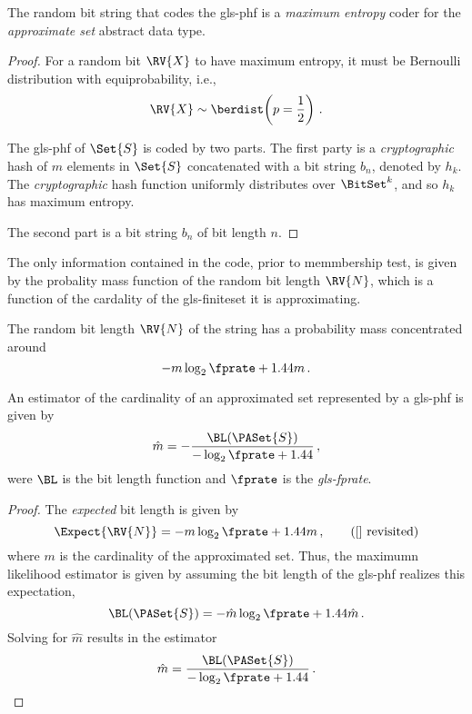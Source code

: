 \begin{theorem}
The random bit string that codes the \gls{gls-phf} is a \emph{maximum entropy} coder for the \emph{approximate set} abstract data type.
\end{theorem}
\begin{proof}
For a random bit $\RV{X}$ to have maximum entropy, it must be Bernoulli distribution with equiprobability, i.e.,
\begin{equation}
    \RV{X} \sim \berdist\!\left(p = \frac{1}{2}\right)\,.
\end{equation}

The \gls{gls-phf} of $\Set{S}$ is coded by two parts. The first party is a \emph{cryptographic} hash of $m$ elements in $\Set{S}$ concatenated with a bit string $b_n$, denoted by $h_k$. The \emph{cryptographic} hash function uniformly distributes over $\BitSet^{k}$, and so $h_k$ has maximum entropy.

The second part is a bit string $b_n$ of bit length $n$.
\end{proof}

The only information contained in the code, prior to memmbership test, is given by the probality mass function of the random bit length $\RV{N}$, which is a function of the cardality of the \gls{gls-finiteset} it is approximating.

The random bit length $\RV{N}$ of the string has a probability mass concentrated around
\begin{equation}
    -m \log_2 \fprate + 1.44 m\,.
\end{equation}


\begin{theorem}
An estimator of the cardinality of an approximated set represented by a \gls{gls-phf} is given by
\begin{equation}
    \hat{m} = -\frac{\BL\!\left(\PASet{S}\right)}{-\log_2 \fprate + 1.44}\,,
\end{equation}
were $\BL$ is the bit length function and $\fprate$ is the \emph{\gls{gls-fprate}}.
\end{theorem}
\begin{proof}
The \emph{expected} bit length is given by
\begin{equation*}
    \Expect{\RV{N}} = -m \log_2 \fprate + 1.44 m\,, 
    \tag{\ref{} revisited}
\end{equation*}
where $m$ is the cardinality of the approximated set. Thus, the maximumn likelihood estimator is given by assuming the bit length of the \gls{gls-phf} realizes this expectation,
\begin{equation}
    \BL(\PASet{S}) = -\hat{m} \log_2 \fprate + 1.44 \hat{m}\,.
\end{equation}
Solving for $\hat{m}$ results in the estimator
\begin{equation}
    \hat{m} = \frac{\BL(\PASet{S})}{-\log_2 \fprate + 1.44}\,.
\end{equation}
\end{proof}



